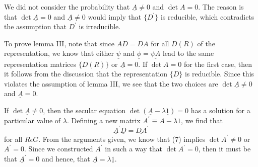 We did not consider the probability that $\underline{A} \not= 0$ and 
$\det A = 0$.  The reason is that $\det \underline{A} = 0$ and 
$\underline{A} \not= 0$ would imply that $\{D^{\prime}\}$ is reducible, 
which contradicts the assumption that $D^{\prime}$ is irreducible.

To prove lemma III, note that since $\underline{AD} = \underline{DA}$ 
for all $D(R)$ of the representation, we know that either 
$\underline{\psi}$ and $\underline{\phi} = \underline{\psi A}$ lead to 
the same representation matrices $\{D(R)\}$ or $\underline{A} = 0$.  
If $\det A = 0$ for the first case, then it follows from the 
discussion that the representation $\{D\}$ is reducible.  Since this 
violates the assumption of lemma III, we see that the two choices 
are $\det \underline{A} \not= 0$ and $\underline{A} = 0$.

If $\det \underline{A} \not= 0$, then the secular equation 
$\det(\underline{A} - \lambda \underline{1}) = 0$ has a solution for a 
particular value of $\lambda$.  Defining a new matrix 
$\underline{A}^{\prime} \equiv \underline{A} - \lambda 
\underline{1}$, we find that
\begin{equation}
\underline{A}^{\prime} \underline{D} = \underline{DA}^{\prime}
\label{chap16app-eqno7}
\end{equation}
for all $R \epsilon G$.  From the arguments given, we know that (7) 
implies $\det A^{\prime} \not= 0$ or $A^{\prime} = 0$.  Since we 
constructed $A^{\prime}$ in such a way that $\det A^{\prime} = 0$, 
then it must be that $\underline{A}^{\prime} = 0$ and hence, that
$\underline{A} = \lambda \underline{1}$.

